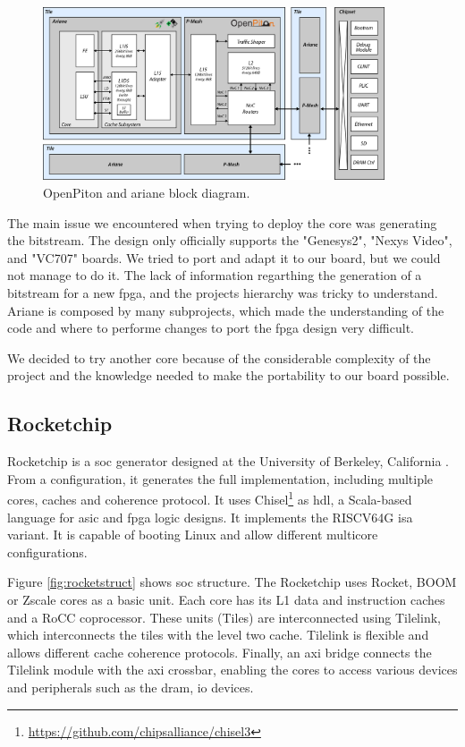 \begin{figure}[h]
    \centering
    \includegraphics[width=0.9\textwidth]{images/openpiton_ariane_blockdiag.png}
    \caption{OpenPiton and ariane block diagram.}
    \label{fig:openpitonariane}
\end{figure}

The main issue we encountered when trying to deploy the core was generating the bitstream. The design only officially supports the "Genesys2", "Nexys Video", and "VC707" boards. We tried to port and adapt it to our board, but we could not manage to do it. 
The lack of information regarthing the generation of a bitstream for a new \gls{fpga}, and the projects hierarchy was tricky to understand.
Ariane is composed by many subprojects, which made the understanding of the code and where to performe changes to port the \gls{fpga} design very difficult.

We decided to try another core because of the considerable complexity of the project and the knowledge needed to make the portability to our board possible.

\subsection{Rocketchip}
Rocketchip is a \gls{soc} generator designed at the University of Berkeley, California \cite{rocket}. From a configuration, it generates the full implementation, including multiple cores, caches and coherence protocol. It uses Chisel\footnote{\url{https://github.com/chipsalliance/chisel3}} as \gls{hdl}, a Scala-based language for \gls{asic} and \gls{fpga} logic designs. It implements the RISCV64G \gls{isa} variant. It is capable of booting Linux and allow different multicore configurations.

Figure \ref{fig:rocketstruct} shows \gls{soc} structure. The Rocketchip uses Rocket, BOOM or Zscale cores as a basic unit. Each core has its L1 data and instruction caches and a RoCC coprocessor. These units (Tiles) are interconnected using Tilelink, which interconnects the tiles with the level two cache. Tilelink is flexible and allows different cache coherence protocols. Finally, an \gls{axi} bridge connects the Tilelink module with the \gls{axi} crossbar, enabling the cores to access various devices and peripherals such as the \gls{dram}, \gls{io} devices.

